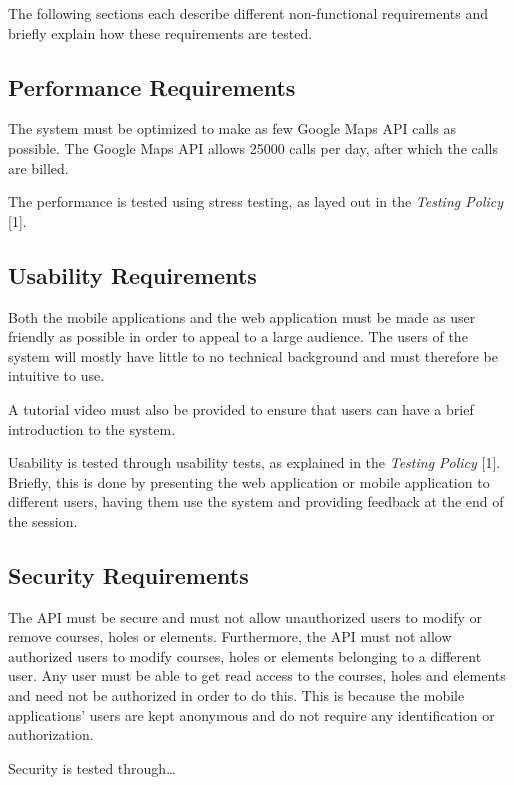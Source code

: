 \documentclass{article}
\begin{document}
    The following sections each describe different non-functional requirements
    and briefly explain how these requirements are tested.

    \subsection{Performance Requirements}

    The system must be optimized to make as few Google Maps API calls as
    possible. The Google Maps API allows 25000 calls per day, after which the
    calls are billed.

    The performance is tested using stress testing, as layed out in the
    \textit{Testing Policy} [1].

    \subsection{Usability Requirements}

    Both the mobile applications and the web application must be made as user
    friendly as possible in order to appeal to a large audience. The users of
    the system will mostly have little to no technical background and must
    therefore be intuitive to use.

    A tutorial video must also be provided to ensure that users can have a brief
    introduction to the system.

    Usability is tested through usability tests, as explained in the
    \textit{Testing Policy} [1]. Briefly, this is done by presenting the web
    application or mobile application to different users, having them use the
    system and providing feedback at the end of the session.

    \subsection{Security Requirements}

    The API must be secure and must not allow unauthorized users to modify or
    remove courses, holes or elements. Furthermore, the API must not allow
    authorized users to modify courses, holes or elements belonging to a
    different user. Any user must be able to get read access to the courses,
    holes and elements and need not be authorized in order to do this. This is
    because the mobile applications' users are kept anonymous and do not
    require any identification or authorization.

    Security is tested through\ldots
\end{document}
